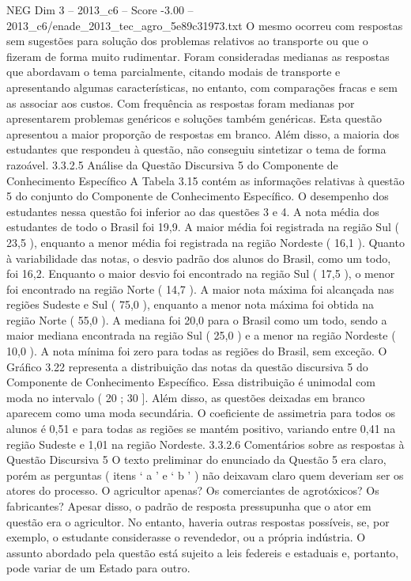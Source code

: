 \begin{textsample}{NEG Dim 3 – 2013\_c6 – Score -3.00 – 2013\_c6/enade\_2013\_tec\_agro\_5e89c31973.txt}
O mesmo ocorreu com respostas sem sugestões para solução dos problemas relativos ao transporte ou que o fizeram de forma muito rudimentar.
Foram consideradas medianas as respostas que abordavam o tema parcialmente, citando modais de transporte e apresentando algumas características, no entanto, com comparações fracas e sem as associar aos custos.
Com frequência as respostas foram medianas por apresentarem problemas genéricos e soluções também genéricas.
Esta questão apresentou a maior proporção de respostas em branco.
Além disso, a maioria dos estudantes que respondeu à questão, não conseguiu sintetizar o tema de forma razoável. 3.3.2.5 Análise da Questão Discursiva 5 do Componente de Conhecimento Específico A Tabela 3.15 contém as informações relativas à questão 5 do conjunto do Componente de Conhecimento Específico.
O desempenho dos estudantes nessa questão foi inferior ao das questões 3 e 4.
A nota média dos estudantes de todo o Brasil foi 19,9.
A maior média foi registrada na região Sul ( 23,5 ), enquanto a menor média foi registrada na região Nordeste ( 16,1 ).
Quanto à variabilidade das notas, o desvio padrão dos alunos do Brasil, como um todo, foi 16,2.
Enquanto o maior desvio foi encontrado na região Sul ( 17,5 ), o menor foi encontrado na região Norte ( 14,7 ).
A maior nota máxima foi alcançada nas regiões Sudeste e Sul ( 75,0 ), enquanto a menor nota máxima foi obtida na região Norte ( 55,0 ).
A mediana foi 20,0 para o Brasil como um todo, sendo a maior mediana encontrada na região Sul ( 25,0 ) e a menor na região Nordeste ( 10,0 ).
A nota mínima foi zero para todas as regiões do Brasil, sem exceção.
O Gráfico 3.22 representa a distribuição das notas da questão discursiva 5 do Componente de Conhecimento Específico.
Essa distribuição é unimodal com moda no intervalo ( 20 ; 30 ].
Além disso, as questões deixadas em branco aparecem como uma moda secundária.
O coeficiente de assimetria para todos os alunos é 0,51 e para todas as regiões se mantém positivo, variando entre 0,41 na região Sudeste e 1,01 na região Nordeste. 3.3.2.6 Comentários sobre as respostas à Questão Discursiva 5 O texto preliminar do enunciado da Questão 5 era claro, porém as perguntas ( itens ‘ a ’ e ‘ b ’ ) não deixavam claro quem deveriam ser os atores do processo.
O agricultor apenas?
Os comerciantes de agrotóxicos?
Os fabricantes?
Apesar disso, o padrão de resposta pressupunha que o ator em questão era o agricultor.
No entanto, haveria outras respostas possíveis, se, por exemplo, o estudante considerasse o revendedor, ou a própria indústria.
O assunto abordado pela questão está sujeito a leis federeis e estaduais e, portanto, pode variar de um Estado para outro.

\end{textsample}
